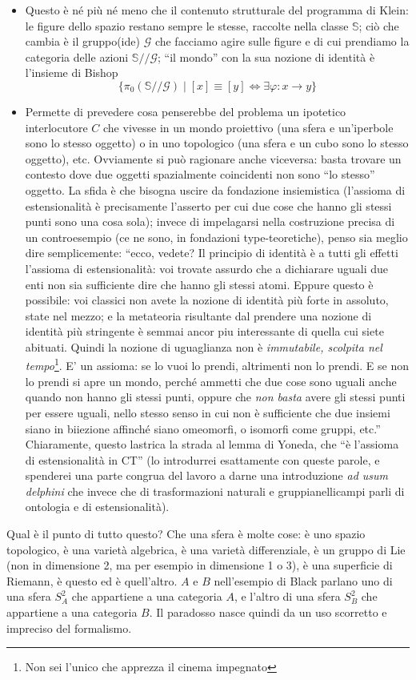 \documentclass[a4paper, 11pt]{article}
\begin{document}
{\begin{itemize}
	\item Questo è né più né meno che il contenuto strutturale del programma di Klein: le figure dello spazio restano sempre le stesse, raccolte nella classe $\mathbb S$; ciò che cambia è il gruppo(ide) $\mathcal G$ che facciamo agire sulle figure e di cui prendiamo la categoria delle azioni $\mathbb S /\!\!/\mathcal G$; ``il mondo'' con la sua nozione di identità è l'insieme di Bishop
	      \[\Big\{ \pi_0(\mathbb S/\!\!/\mathcal G) \mid [x] \equiv [y] \iff \exists \varphi : x \to y\Big\}\]
	\item Permette di prevedere cosa penserebbe del problema un ipotetico interlocutore $C$ che vivesse in un mondo proiettivo (una sfera e un'iperbole sono lo stesso oggetto) o in uno topologico (una sfera e un cubo sono lo stesso oggetto), etc. Ovviamente si può ragionare anche viceversa: basta trovare un contesto dove due oggetti spazialmente coincidenti non sono ``lo stesso'' oggetto. La sfida è che bisogna uscire da fondazione insiemistica (l'assioma di estensionalità è precisamente l'asserto per cui due cose che hanno gli stessi punti sono una cosa sola); invece di impelagarsi nella costruzione precisa di un controesempio (ce ne sono, in fondazioni type-teoretiche), penso sia meglio dire semplicemente: ``ecco, vedete? Il principio di identità è  a tutti gli effetti l'assioma di estensionalità: voi trovate assurdo che a dichiarare uguali due enti non sia sufficiente dire che hanno gli stessi atomi. Eppure questo è possibile: voi classici non avete la nozione di identità più forte in assoluto, state nel mezzo; e la metateoria risultante dal prendere una nozione di identità più stringente è semmai ancor piu interessante di quella cui siete abituati. Quindi la nozione di uguaglianza non è \emph{immutabile, scolpita nel tempo}\footnote{Non sei l'unico che apprezza il cinema impegnato}. E' un assioma: se lo vuoi lo prendi, altrimenti non lo prendi. E se non lo prendi si apre un mondo, perché ammetti che due cose sono uguali anche quando non hanno gli stessi punti, oppure che \emph{non basta} avere gli stessi punti per essere uguali, nello stesso senso in cui non è sufficiente che due insiemi siano in biiezione affinché siano omeomorfi, o isomorfi come gruppi, etc.'' Chiaramente, questo lastrica la strada al lemma di Yoneda, che ``è l'assioma di estensionalità in CT'' (lo introdurrei esattamente con queste parole, e spenderei una parte congrua del lavoro a darne una introduzione \emph{ad usum delphini} che invece che di trasformazioni naturali e gruppianellicampi parli di ontologia e di estensionalità).
\end{itemize}
Qual è il punto di tutto questo? Che una sfera è molte cose: è uno spazio topologico, è una varietà algebrica, è una varietà differenziale, è un gruppo di Lie (non in dimensione 2, ma per esempio in dimensione 1 o 3), è una superficie di Riemann, è questo ed è quell'altro. $A$ e $B$ nell'esempio di Black parlano uno di una sfera $S^2_A$ che appartiene a una categoria $A$, e l'altro di una sfera $S^2_B$ che appartiene a una categoria $B$. Il paradosso nasce quindi da un uso scorretto e impreciso del formalismo.

}
\end{document}
